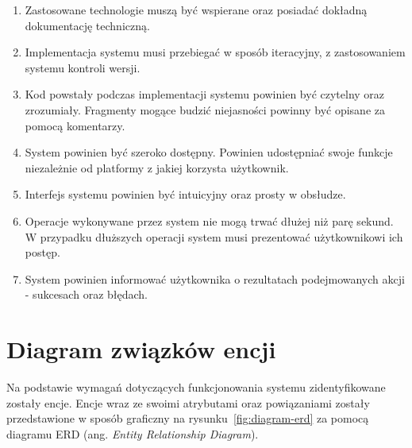 \begin{enumerate}

\item Zastosowane technologie muszą być wspierane oraz posiadać dokładną dokumentację techniczną.

\item Implementacja systemu musi przebiegać w sposób iteracyjny, z zastosowaniem systemu kontroli wersji.

\item Kod powstały podczas implementacji systemu powinien być czytelny oraz zrozumiały. Fragmenty mogące budzić niejasności powinny być opisane za pomocą komentarzy.

\item System powinien być szeroko dostępny. Powinien udostępniać swoje funkcje niezależnie od platformy z jakiej korzysta użytkownik. 

\item Interfejs systemu powinien być intuicyjny oraz prosty w obsłudze.

\item Operacje wykonywane przez system nie mogą trwać dłużej niż parę sekund. W przypadku dłuższych operacji system musi prezentować użytkownikowi ich postęp.

\item System powinien informować użytkownika o rezultatach podejmowanych akcji - sukcesach oraz błędach.

\end{enumerate}


\section{Diagram związków encji}

Na podstawie wymagań dotyczących funkcjonowania systemu zidentyfikowane zostały encje. Encje wraz ze swoimi atrybutami oraz powiązaniami zostały przedstawione w sposób graficzny na rysunku~\ref{fig:diagram-erd} za pomocą diagramu ERD (ang. \textit{Entity Relationship Diagram}).

